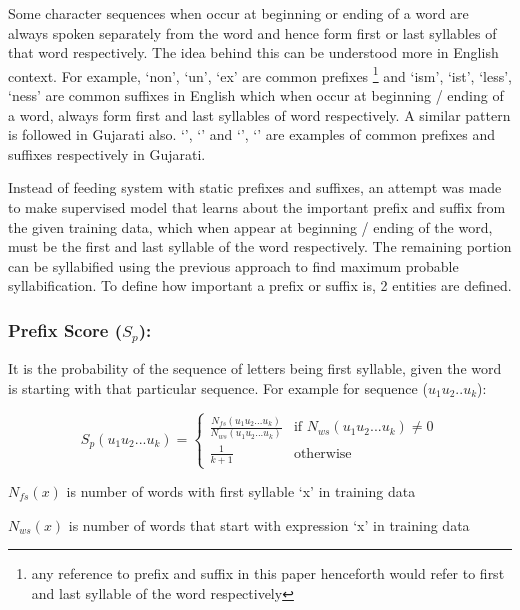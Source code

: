 \documentclass[runningheads,a4paper]{llncs}
\begin{document}
Some character sequences when occur at beginning or ending of a word are always spoken separately from the word and hence form first or last syllables of that word respectively. The idea behind this can be understood more in English context. For example, `non', `un', `ex' are common prefixes \footnote{any reference to prefix and suffix in this paper henceforth would refer to first and last syllable of the word respectively} and `ism', `ist', `less', `ness' are common suffixes in English which when occur at beginning / ending of a word, always form first and last syllables of word respectively. A similar pattern is followed in Gujarati also. `{}', `{}' and `{}', `{}' are examples of common prefixes and suffixes respectively in Gujarati.

Instead of feeding system with static prefixes and suffixes, an attempt was made to make supervised model that learns about the important prefix and suffix from the given training data, which when appear at beginning / ending of the word, must be the first and last syllable of the word respectively. The remaining portion can be syllabified using the previous approach to find maximum probable syllabification. To define how important a prefix or suffix is, 2 entities are defined. %

\subsubsection*{Prefix Score ($S_p$): }
It is the probability of the sequence of letters being first syllable, given the word is starting with that particular sequence. For example for sequence ($u_1u_2..u_k$):


\begin{equation}
	S_p(u_1u_2...u_k)
	=
	\begin{cases}
		\frac{  N_{fs}( u_1u_2...u_k ) }{ N_{ws}( u_1u_2...u_k ) } & \mbox{if } N_{ws}( u_1u_2...u_k ) \neq 0 \\
		\frac{ 1 }{ k + 1 } & \mbox{otherwise}
	\end{cases}
\end{equation}

\begin{small}
$N_{fs}( x )$ is number of words with first syllable `x' in training data

$N_{ws}( x )$ is number of words that start with expression `x' in training data
\end{small}
\end{document}
